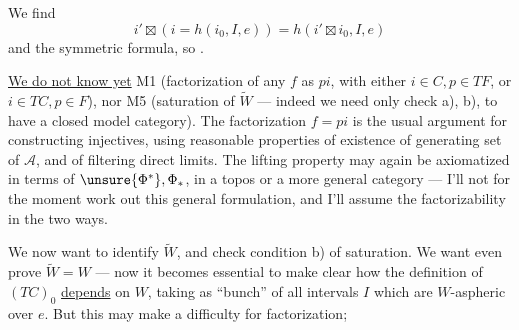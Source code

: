 
We find
\[
i'\boxtimes(i=h(i_0,I,e))=h(i'\boxtimes i_0,I,e)
\]
and the symmetric formula, so .

\uline{We do not know yet} M1 (factorization of any $f$ as $pi$, with either $i\in C,p\in TF$, or $i\in TC,p\in F$), nor M5 (saturation of $\widetilde W$ --- indeed we need only check a), b), to have a closed model category). The factorization $f=pi$ is the usual argument for constructing injectives, using reasonable properties of existence of  generating set of $\mathcal A$, and of filtering direct limits.
The lifting property may again be axiomatized in terms of $\unsure{\Phi^*},\Phi_*$, in a topos or a more general category --- I'll not for the moment work out this general formulation, and  I'll assume the factorizability  in the two ways.

We now want to identify $\widetilde W$, and check condition b) of saturation. We want even prove $\widetilde W=W$ --- now it becomes essential to  make clear how the definition of $(TC)_0$ \uline{depends} on $W$, taking as ``bunch'' of  all intervals $I$ which are $W$-aspheric over $e$. But this may make a difficulty for factorization;
